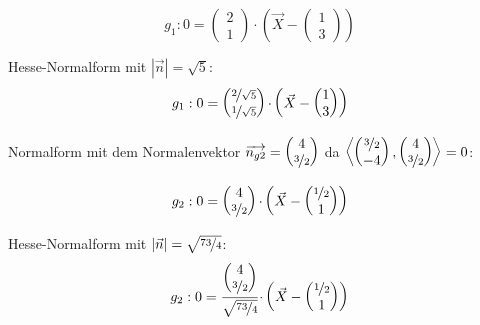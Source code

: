 \documentclass[main.tex]{subfiles}
\begin{document}
\begin{equation*}
    g_{1} :0=\begin{pmatrix}
    2\\
    1
    \end{pmatrix} \cdotp \left(\vec{X} -\begin{pmatrix}
    1\\
    3
    \end{pmatrix}\right)
\end{equation*}

Hesse-Normalform mit $\displaystyle |\vec{n} |=\sqrt{5}$:
\begin{equation*}
    g_{1} :0=\begin{pmatrix}
    \nicefrac{2}{\sqrt{5}}\\
    \nicefrac{1}{\sqrt{5}}
    \end{pmatrix} \cdotp \left(\vec{X} -\begin{pmatrix}
    1\\
    3
    \end{pmatrix}\right)
\end{equation*}


Normalform mit dem Normalenvektor $\overrightarrow{n_{g2}} =\begin{pmatrix}
4\\
\nicefrac{3}{2}
\end{pmatrix}$ da $\left< \begin{pmatrix}
\nicefrac{3}{2}\\
-4
\end{pmatrix} ,\begin{pmatrix}
4\\
\nicefrac{3}{2}
\end{pmatrix}\right> =0$:

\begin{equation*}
    g_{2} :0=\begin{pmatrix}
    4\\
    \nicefrac{3}{2}
    \end{pmatrix} \cdotp \left(\vec{X} -\begin{pmatrix}
    \nicefrac{1}{2}\\
    1
    \end{pmatrix}\right)
\end{equation*}

Hesse-Normalform mit $|\vec{n} |=\sqrt{\nicefrac{73}{4}}$:
\begin{equation*}
    g_{2} :0=\frac{\begin{pmatrix}
    4\\
    \nicefrac{3}{2}
    \end{pmatrix}}{\sqrt{\nicefrac{73}{4}}} \cdotp \left(\vec{X} -\begin{pmatrix}
    \nicefrac{1}{2}\\
    1
    \end{pmatrix}\right)
\end{equation*}
\end{document}
